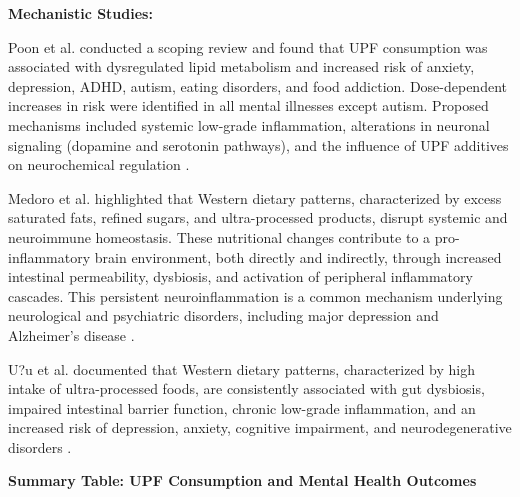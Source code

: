 \documentclass[journal,twoside,10pt]{IEEEtran}
\begin{document}
\textbf{Mechanistic Studies:}

Poon et al. \cite{ref3} conducted a scoping review and found that UPF consumption was associated with dysregulated lipid metabolism and increased risk of anxiety, depression, ADHD, autism, eating disorders, and food addiction. Dose-dependent increases in risk were identified in all mental illnesses except autism. Proposed mechanisms included systemic low-grade inflammation, alterations in neuronal signaling (dopamine and serotonin pathways), and the influence of UPF additives on neurochemical regulation \cite{ref3}.

Medoro et al. \cite{ref17} highlighted that Western dietary patterns, characterized by excess saturated fats, refined sugars, and ultra-processed products, disrupt systemic and neuroimmune homeostasis. These nutritional changes contribute to a pro-inflammatory brain environment, both directly and indirectly, through increased intestinal permeability, dysbiosis, and activation of peripheral inflammatory cascades. This persistent neuroinflammation is a common mechanism underlying neurological and psychiatric disorders, including major depression and Alzheimer's disease \cite{ref17}.

U?u et al. \cite{ref9} documented that Western dietary patterns, characterized by high intake of ultra-processed foods, are consistently associated with gut dysbiosis, impaired intestinal barrier function, chronic low-grade inflammation, and an increased risk of depression, anxiety, cognitive impairment, and neurodegenerative disorders \cite{ref9}.

\textbf{Summary Table: UPF Consumption and Mental Health Outcomes}
\end{document}
